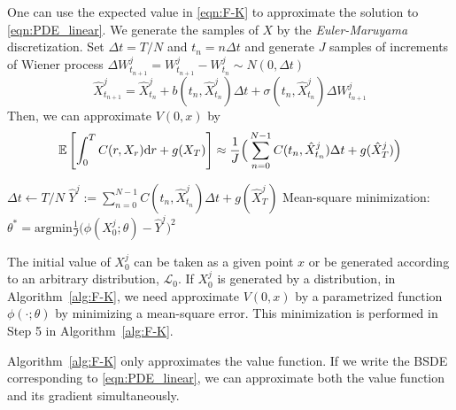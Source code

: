 \documentclass[11pt]{book}
\newcommand{\dr}{\text{\normalfont d}r}
\begin{document}
One can use the expected value in \eqref{eqn:F-K} to approximate the solution to \eqref{eqn:PDE_linear}. We generate the samples of $X$ by the \emph{Euler-Maruyama} discretization. Set $\Delta t = T/N$ and $t_n=n\Delta t$ and generate $J$ samples of increments of Wiener process $\Delta W_{t_{n+1}}^j=W_{t_{n+1}}^j-W_{t_{n}}^j\sim N(0,\Delta t)$
\begin{equation}
\label{eqn:Euler-Maruyama}
    \hat{X}^j_{t_{n+1}} = \hat{X}^j_{t_{n}} + b(t_n,\hat{X}_{t_n}^j)\Delta t+\sigma(t_n,\hat{X}_{t_n}^j)\Delta W_{t_{n+1}}^j
\end{equation}
Then, we can approximate $V(0,x)$ by
\[
\mathbb{E}\left[\int_0^T C(r,X_r){{\dr}}+g(X_T)\right]\approx\frac{1}{J}\Big(\sum_{n=0}^{N-1} C(t_n,\hat{X}_{t_n}^j)\Delta t+g(\hat{X}_T^j)\Big)
\]
\begin{algorithm}
        $\Delta t \gets T/N$\;
        $\hat{Y}^j:=\sum_{n=0}^{N-1}C(t_n,\hat{X}_{t_n}^j)\Delta t+g(\hat{X}_T^j)$\;
        Mean-square minimization: $\theta^*=\text{argmin}\frac{1}{J} \Big(\phi(X_0^j;\theta)-\hat{Y}^j\Big)^2$\;
        \caption{Feynman-Kac approximation for linear parabolic equations}
        \label{alg:F-K}
\end{algorithm}
The initial value of $X_0^j$ can be taken as a given point $x$ or be generated according to an arbitrary distribution, $\mathcal{L}_0$. 
If $X_0^j$ is generated by a distribution, in Algorithm~\ref{alg:F-K}, we need approximate $V(0,x)$ by a parametrized function $\phi(\cdot;\theta)$ by minimizing a mean-square error. This minimization is performed in Step 5 in  Algorithm~\ref{alg:F-K}.


Algorithm~\ref{alg:F-K} only approximates the value function. If we write the BSDE corresponding to \eqref{eqn:PDE_linear}, we can approximate both the value function and its gradient simultaneously. 
\end{document}
